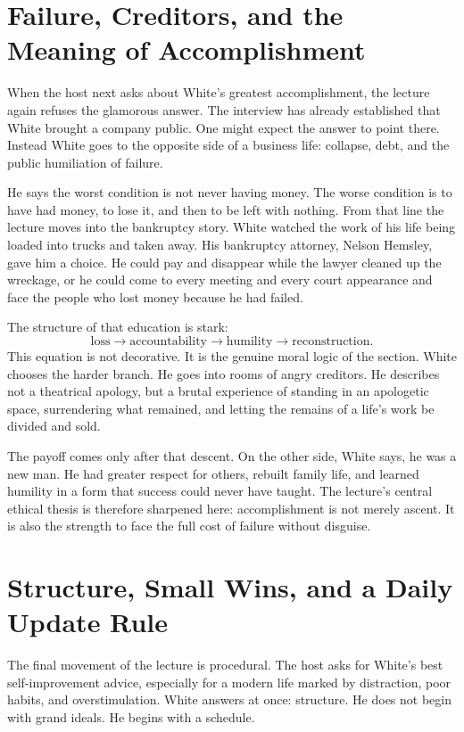 \section{Failure, Creditors, and the Meaning of Accomplishment}

When the host next asks about White's greatest accomplishment, the lecture again refuses the glamorous answer. The interview has already established that White brought a company public. One might expect the answer to point there. Instead White goes to the opposite side of a business life: collapse, debt, and the public humiliation of failure.

He says the worst condition is not never having money. The worse condition is to have had money, to lose it, and then to be left with nothing. From that line the lecture moves into the bankruptcy story. White watched the work of his life being loaded into trucks and taken away. His bankruptcy attorney, Nelson Hemsley, gave him a choice. He could pay and disappear while the lawyer cleaned up the wreckage, or he could come to every meeting and every court appearance and face the people who lost money because he had failed.

The structure of that education is stark:
\begin{equation}
\text{loss}
\to
\text{accountability}
\to
\text{humility}
\to
\text{reconstruction}.
\end{equation}
This equation is not decorative. It is the genuine moral logic of the section. White chooses the harder branch. He goes into rooms of angry creditors. He describes not a theatrical apology, but a brutal experience of standing in an apologetic space, surrendering what remained, and letting the remains of a life's work be divided and sold.

The payoff comes only after that descent. On the other side, White says, he was a new man. He had greater respect for others, rebuilt family life, and learned humility in a form that success could never have taught. The lecture's central ethical thesis is therefore sharpened here: accomplishment is not merely ascent. It is also the strength to face the full cost of failure without disguise.

\section{Structure, Small Wins, and a Daily Update Rule}

The final movement of the lecture is procedural. The host asks for White's best self-improvement advice, especially for a modern life marked by distraction, poor habits, and overstimulation. White answers at once: structure. He does not begin with grand ideals. He begins with a schedule.

